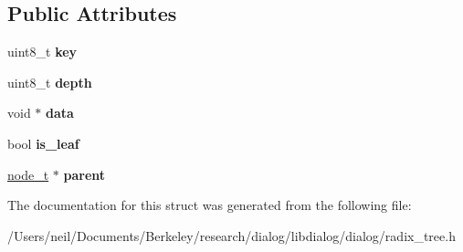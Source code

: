 \subsection*{Public Attributes}
\begin{DoxyCompactItemize}
\item 
\mbox{\label{structdialog_1_1index_1_1radix__tree__node_ae671cbfb97860434cfa1b1508807da6c}} 
uint8\+\_\+t {\bfseries key}
\item 
\mbox{\label{structdialog_1_1index_1_1radix__tree__node_ac8057cfc7492d204d6997ce4b5151846}} 
uint8\+\_\+t {\bfseries depth}
\item 
\mbox{\label{structdialog_1_1index_1_1radix__tree__node_adee6d7afc7e021b9f432e1766c908594}} 
void $\ast$ {\bfseries data}
\item 
\mbox{\label{structdialog_1_1index_1_1radix__tree__node_a149dbbb1e15ebc571ece3e6aeafa3392}} 
bool {\bfseries is\+\_\+leaf}
\item 
\mbox{\label{structdialog_1_1index_1_1radix__tree__node_ace7536851ade6aa80f8aeafcf9a6ec39}} 
\hyperlink{structdialog_1_1index_1_1radix__tree__node}{node\+\_\+t} $\ast$ {\bfseries parent}
\end{DoxyCompactItemize}


The documentation for this struct was generated from the following file\+:\begin{DoxyCompactItemize}
\item 
/\+Users/neil/\+Documents/\+Berkeley/research/dialog/libdialog/dialog/radix\+\_\+tree.\+h\end{DoxyCompactItemize}
